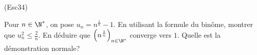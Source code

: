 \begin{tiny}(Esc34)\end{tiny} Pour $n\in \N^*$, on pose $u_n = n^{\frac{1}{n}} -1$. 
En utilisant la formule du binôme, montrer que $u_{n}^2 \leq \frac{2}{n}$. En déduire que $\left( n^{\frac{1}{n}} \right)_{n \in \N^*}$ converge vers $1$. Quelle est la démonstration normale?
